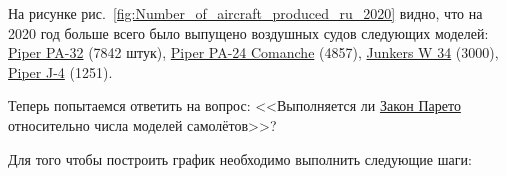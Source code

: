 
На рисунке рис.~\ref{fig:Number_of_aircraft_produced_ru_2020} видно, что на 2020 год больше всего было выпущено воздушных судов следующих моделей: \href{https://www.wikidata.org/wiki/Q2096452}{Piper PA-32} (\num{7842} штук), \href{https://www.wikidata.org/wiki/Q1860367}{Piper PA-24 Comanche} (\num{4857}), \href{https://www.wikidata.org/wiki/Q694521}{Junkers W 34} (\num{3000}), \href{https://www.wikidata.org/wiki/Q4046989}{Piper J-4} (\num{1251}).


\begin{figure*}[h]

    \setlength{\fboxsep}{0pt}%
    \setlength{\fboxrule}{1pt}%

	\caption{Количество выпущенных воздушных судов по моделям, 2020.}%
    \label{fig:Number_of_aircraft_produced_ru_2020}%
\end{figure*}


Теперь попытаемся ответить на вопрос: <<Выполняется ли \href{https://clck.ru/JvaaU}{Закон Парето} относительно числа моделей самолётов>>?

Для того чтобы построить график необходимо выполнить следующие шаги:

\label{aircraft_question_2}

